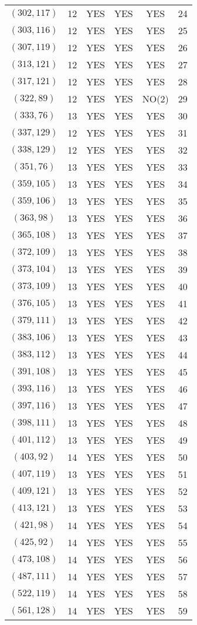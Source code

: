 \begin{longtable}{|c|c|c|c|c|c|}
$(302, 117)$ & 12 & YES & YES & YES & 24\\
$(303, 116)$ & 12 & YES & YES & YES & 25\\
$(307, 119)$ & 12 & YES & YES & YES & 26\\
$(313, 121)$ & 12 & YES & YES & YES & 27\\
$(317, 121)$ & 12 & YES & YES & YES & 28\\
$(322, 89)$ & 12 & YES & YES & NO(2) & 29\\
$(333, 76)$ & 13 & YES & YES & YES & 30\\
$(337, 129)$ & 12 & YES & YES & YES & 31\\
$(338, 129)$ & 12 & YES & YES & YES & 32\\
$(351, 76)$ & 13 & YES & YES & YES & 33\\
$(359, 105)$ & 13 & YES & YES & YES & 34\\
$(359, 106)$ & 13 & YES & YES & YES & 35\\
$(363, 98)$ & 13 & YES & YES & YES & 36\\
$(365, 108)$ & 13 & YES & YES & YES & 37\\
$(372, 109)$ & 13 & YES & YES & YES & 38\\
$(373, 104)$ & 13 & YES & YES & YES & 39\\
$(373, 109)$ & 13 & YES & YES & YES & 40\\
$(376, 105)$ & 13 & YES & YES & YES & 41\\
$(379, 111)$ & 13 & YES & YES & YES & 42\\
$(383, 106)$ & 13 & YES & YES & YES & 43\\
$(383, 112)$ & 13 & YES & YES & YES & 44\\
$(391, 108)$ & 13 & YES & YES & YES & 45\\
$(393, 116)$ & 13 & YES & YES & YES & 46\\
$(397, 116)$ & 13 & YES & YES & YES & 47\\
$(398, 111)$ & 13 & YES & YES & YES & 48\\
$(401, 112)$ & 13 & YES & YES & YES & 49\\
$(403, 92)$ & 14 & YES & YES & YES & 50\\
$(407, 119)$ & 13 & YES & YES & YES & 51\\
$(409, 121)$ & 13 & YES & YES & YES & 52\\
$(413, 121)$ & 13 & YES & YES & YES & 53\\
$(421, 98)$ & 14 & YES & YES & YES & 54\\
$(425, 92)$ & 14 & YES & YES & YES & 55\\
$(473, 108)$ & 14 & YES & YES & YES & 56\\
$(487, 111)$ & 14 & YES & YES & YES & 57\\
$(522, 119)$ & 14 & YES & YES & YES & 58\\
$(561, 128)$ & 14 & YES & YES & YES & 59
\end{longtable}
